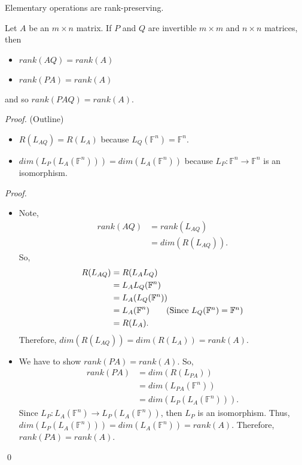 \documentclass[12pt]{article}
\newenvironment{theorem}[2][Theorem]{\begin{trivlist}
\item[\hskip \labelsep {\bfseries #1}\hskip \labelsep {\bfseries #2.}]}{\end{trivlist}}
\newenvironment{corollary}[2][Corollary]{\begin{trivlist}
\item[\hskip \labelsep {\bfseries #1}\hskip \labelsep {\bfseries #2}]}{\end{trivlist}}
\newenvironment{sol}
    {\emph{Proof.}
    }
    {
    \qed
    }
\begin{document}
\begin{corollary}{3.4.1}
Elementary operations are rank-preserving.
\end{corollary}

\begin{theorem}{3.4}
Let $A$ be an $m \times n$ matrix. If $P$ and $Q$ are invertible $m \times m$ and $n \times n$ matrices, then 

\begin{itemize}
    \item $rank(AQ) = rank(A)$
    
    \item $rank(PA) = rank(A)$
\end{itemize}
and so $rank(PAQ) = rank(A)$.
\end{theorem}

\textit{Proof.} (Outline)
\begin{itemize}
    \item $R(L_{AQ}) = R(L_A)$ because $L_Q(\mathbb{F}^n) = \mathbb{F}^n$.
    
    \item $dim(L_P(L_A(\mathbb{F}^n))) = dim(L_A(\mathbb{F}^n))$ because $L_P : \mathbb{F}^n \to \mathbb{F}^n$ is an isomorphism.
\end{itemize}

\begin{sol}
\begin{itemize}
    \item[(1)] Note, \begin{align*}
        rank(AQ) &= rank(L_{AQ}) \\
        &= dim(R(L_{AQ})).
    \end{align*} So,
    \begin{align*}
        R(L_{AQ}) &= R(L_AL_Q) \\
        &= L_AL_Q(\mathbb{F}^n) \\
        &= L_A(L_Q(\mathbb{F}^n)) \\ 
        &= L_A(\mathbb{F}^n) \tag*{(Since $L_Q(\mathbb{F}^n) = \mathbb{F}^n$)}\\
        &= R(L_A).
    \end{align*} 
    Therefore, $dim(R(L_{AQ})) = dim(R(L_A)) = rank(A).$ 
    
    \item[(2)] We have to show $rank(PA) = rank(A)$. So, \begin{align*}
        rank(PA) &= dim(R(L_{PA})) \\
        &= dim(L_{PA}(\mathbb{F}^n)) \\
        &= dim(L_P(L_A(\mathbb{F}^n))).
    \end{align*} Since $L_P : L_A(\mathbb{F}^n) \to L_P(L_A(\mathbb{F}^n))$, then $L_P$ is an isomorphism. Thus, $dim(L_P(L_A(\mathbb{F}^n))) = dim(L_A(\mathbb{F}^n)) = rank(A)$. Therefore, $rank(PA) = rank(A)$.
\end{itemize}
\end{sol}
\end{document}
